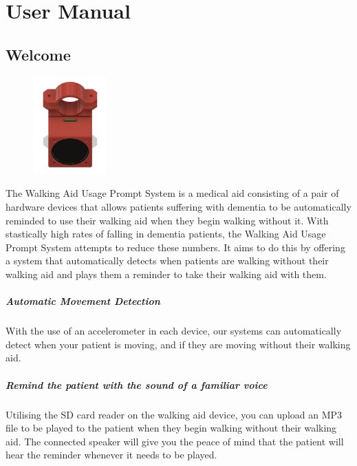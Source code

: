 \chapter{User Manual}
\label{ch:usermanual}

	\section{Welcome}
	\label{sec:welcome}

		\begin{figure}
			\vspace{-5em}
			\centering
			\includegraphics[width=0.25\textwidth]{graphics/final-cad.png}
		\end{figure}

		The Walking Aid Usage Prompt System is a medical aid consisting of a pair of hardware devices that allows patients suffering with dementia to be automatically reminded to use their walking aid when they begin walking without it. With stastically high rates of falling in dementia patients, the Walking Aid Usage Prompt System attempts to reduce these numbers. It aims to do this by offering a system that automatically detects when patients are walking without their walking aid and plays them a reminder to take their walking aid with them.

		\paragraph{Automatic Movement Detection}\mbox{}

		With the use of an accelerometer in each device, our systems can automatically detect when your patient is moving, and if they are moving without their walking aid.

		\paragraph{Remind the patient with the sound of a familiar voice}\mbox{}

		Utilising the SD card reader on the walking aid device, you can upload an MP3 file to be played to the patient when they begin walking without their walking aid. The connected speaker will give you the peace of mind that the patient will hear the reminder whenever it needs to be played.

